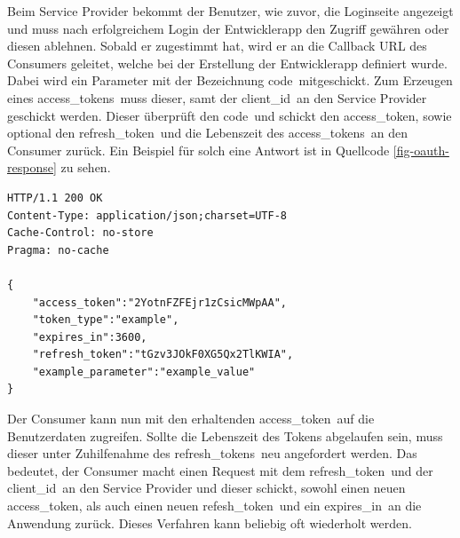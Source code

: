 Beim Service Provider bekommt der Benutzer, wie zuvor, die Loginseite angezeigt und muss nach erfolgreichem Login der Entwicklerapp den Zugriff gewähren oder diesen ablehnen.
Sobald er zugestimmt hat, wird er an die Callback \ac{URL} des Consumers geleitet, welche bei der Erstellung der Entwicklerapp definiert wurde.
Dabei wird ein Parameter mit der Bezeichnung \frqq code\flqq\ mitgeschickt.
Zum Erzeugen eines \frqq access\_tokens\flqq\ muss dieser, samt der \frqq client\_id\flqq\ an den Service Provider geschickt werden.
Dieser überprüft den \frqq code\flqq\ und schickt den \frqq access\_token\flqq , sowie optional den \frqq refresh\_token\flqq\ und die Lebenszeit des \frqq access\_tokens\flqq\ an den Consumer zurück.
Ein Beispiel für solch eine Antwort ist in Quellcode \ref{fig-oauth-response} zu sehen.

\begin{lstlisting}[label=fig-oauth-response,caption={[Aufbau eines Response vom Service Provider an den Consumer]Aufbau eines Response vom Service Provider an den Consumer\cite{oauth12}}]
HTTP/1.1 200 OK
Content-Type: application/json;charset=UTF-8
Cache-Control: no-store
Pragma: no-cache

{
    "access_token":"2YotnFZFEjr1zCsicMWpAA",
    "token_type":"example",
    "expires_in":3600,
    "refresh_token":"tGzv3JOkF0XG5Qx2TlKWIA",
    "example_parameter":"example_value"
}
\end{lstlisting}

Der Consumer kann nun mit den erhaltenden \frqq access\_token\flqq\ auf die Benutzerdaten zugreifen.
Sollte die Lebenszeit des Tokens abgelaufen sein, muss dieser unter Zuhilfenahme des \frqq refresh\_tokens\flqq\ neu angefordert werden.
Das bedeutet, der Consumer macht einen Request mit dem \frqq refresh\_token\flqq\ und der \frqq client\_id\flqq\ an den Service Provider und dieser schickt, sowohl einen neuen \frqq access\_token\flqq , als auch einen neuen \frqq refesh\_token\flqq\ und ein \frqq expires\_in\flqq\ an die Anwendung zurück.
Dieses Verfahren kann beliebig oft wiederholt werden.
